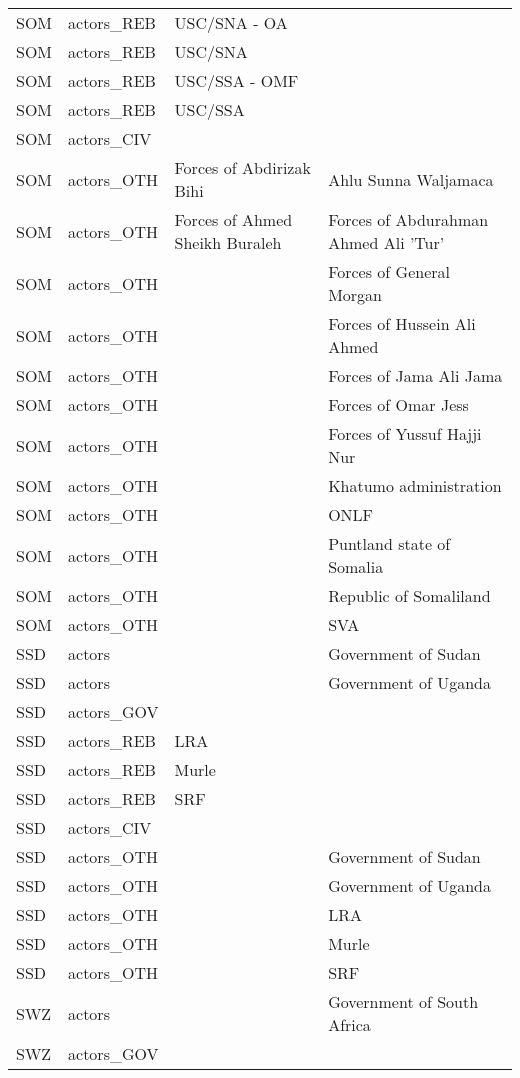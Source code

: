 \begin{table}[ht]
\begin{tabular}{llll}
  SOM & actors\_REB & USC/SNA - OA &  \\ 
  SOM & actors\_REB & USC/SNA &  \\ 
  SOM & actors\_REB & USC/SSA - OMF &  \\ 
  SOM & actors\_REB & USC/SSA &  \\ 
  SOM & actors\_CIV &  &  \\ 
  SOM & actors\_OTH & Forces of Abdirizak Bihi & Ahlu Sunna Waljamaca \\ 
  SOM & actors\_OTH & Forces of Ahmed Sheikh Buraleh & Forces of Abdurahman Ahmed Ali 'Tur' \\ 
  SOM & actors\_OTH &  & Forces of General Morgan \\ 
  SOM & actors\_OTH &  & Forces of Hussein Ali Ahmed \\ 
  SOM & actors\_OTH &  & Forces of Jama Ali Jama \\ 
  SOM & actors\_OTH &  & Forces of Omar Jess \\ 
  SOM & actors\_OTH &  & Forces of Yussuf Hajji Nur \\ 
  SOM & actors\_OTH &  & Khatumo administration \\ 
  SOM & actors\_OTH &  & ONLF \\ 
  SOM & actors\_OTH &  & Puntland state of Somalia \\ 
  SOM & actors\_OTH &  & Republic of Somaliland \\ 
  SOM & actors\_OTH &  & SVA \\ 
  SSD & actors &  & Government of Sudan \\ 
  SSD & actors &  & Government of Uganda \\ 
  SSD & actors\_GOV &  &  \\ 
  SSD & actors\_REB & LRA &  \\ 
  SSD & actors\_REB & Murle &  \\ 
  SSD & actors\_REB & SRF &  \\ 
  SSD & actors\_CIV &  &  \\ 
  SSD & actors\_OTH &  & Government of Sudan \\ 
  SSD & actors\_OTH &  & Government of Uganda \\ 
  SSD & actors\_OTH &  & LRA \\ 
  SSD & actors\_OTH &  & Murle \\ 
  SSD & actors\_OTH &  & SRF \\ 
  SWZ & actors &  & Government of South Africa \\ 
  SWZ & actors\_GOV &  &  \\ 

\end{tabular}
\end{table}

